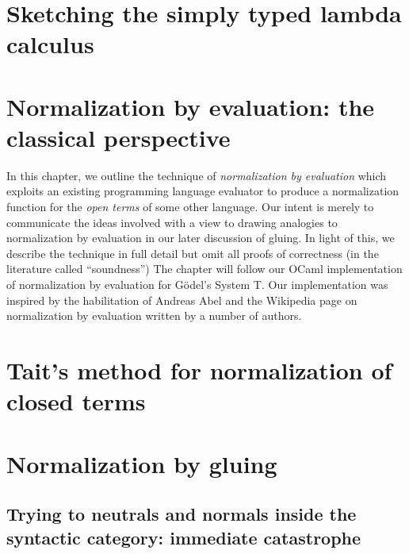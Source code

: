\documentclass[12pt,twoside]{reedthesis}
\theoremstyle{definition}
\theoremstyle{remark}
\theoremstyle{plain}
\begin{document}
\chapter{Sketching the simply typed lambda calculus}


\chapter{Normalization by evaluation: the classical perspective}
In this chapter, we outline the technique of \emph{normalization by evaluation}
which exploits an existing programming language evaluator to produce a
normalization function for the \emph{open terms} of some other language. Our
intent is merely to communicate the ideas involved with a view to drawing
analogies to normalization by evaluation in our later discussion of gluing. In
light of this, we describe the technique in full detail but omit all proofs of
correctness (in the literature called ``soundness'') %
The chapter will follow our OCaml implementation of normalization by evaluation
for G\"odel's System T. Our implementation was inspired by the habilitation of
Andreas Abel and the Wikipedia page on normalization by evaluation written by a
number of authors.

\chapter{Tait's method for normalization of closed terms}

\chapter{Normalization by gluing}
\section{Trying to neutrals and normals inside the syntactic category: immediate catastrophe} %
\newcommand{\red}{\rightarrow^{*}} %
\end{document}
